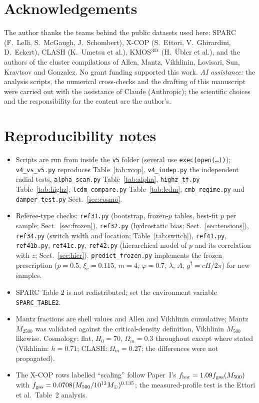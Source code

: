 \documentclass[11pt,a4paper]{article}
\newcommand{\gdag}{g^{\dagger}}
\newcommand{\Msun}{M_\odot}
\newcommand{\fgas}{f_{\rm gas}}
\begin{document}
\section*{Acknowledgements}
The author thanks the teams behind the public datasets used here: SPARC (F.~Lelli, S.~McGaugh, J.~Schombert), X-COP (S.~Ettori, V.~Ghirardini, D.~Eckert), CLASH (K.~Umetsu et al.), KMOS$^{\rm 3D}$ (H.~\"Ubler et al.), and the authors of the cluster compilations of Allen, Mantz, Vikhlinin, Lovisari, Sun, Kravtsov and Gonzalez. No grant funding supported this work. \emph{AI assistance:} the analysis scripts, the numerical cross-checks and the drafting of this manuscript were carried out with the assistance of Claude (Anthropic); the scientific choices and the responsibility for the content are the author's.

\appendix
\section{Reproducibility notes}
\label{app:repro}
\begin{itemize}[leftmargin=2em,itemsep=0.1em]
\item Scripts are run from inside the \texttt{v5} folder (several use \texttt{exec(open(\dots))}); \texttt{v4\_vs\_v5.py} reproduces Table~\ref{tab:xcop}, \texttt{v4\_indep.py} the independent radial tests, \texttt{alpha\_scan.py} Table~\ref{tab:alpha}, \texttt{highz\_tf.py} Table~\ref{tab:highz}, \texttt{lcdm\_compare.py} Table~\ref{tab:lcdm}, \texttt{cmb\_regime.py} and \texttt{damper\_test.py} Sect.~\ref{sec:cosmo}.
\item Referee-type checks: \texttt{ref31.py} (bootstrap, frozen-$p$ tables, best-fit $p$ per sample; Sect.~\ref{sec:frozen}), \texttt{ref32.py} (hydrostatic bias; Sect.~\ref{sec:tensions}), \texttt{ref34.py} (switch width and location; Table~\ref{tab:switch}), \texttt{ref41.py}, \texttt{ref41b.py}, \texttt{ref41c.py}, \texttt{ref42.py} (hierarchical model of $p$ and its correlation with $z$; Sect.~\ref{sec:hier}). \texttt{predict\_frozen.py} implements the frozen prescription ($p=0.5$, $\xi_c=0.115$, $m=4$, $\varphi=0.7$, $\lambda$, $A$, $\gdag=cH/2\pi$) for new samples.
\item SPARC Table 2 is not redistributed; set the environment variable \texttt{SPARC\_TABLE2}.
\item Mantz fractions are shell values and Allen and Vikhlinin cumulative; Mantz $M_{2500}$ was validated against the critical-density definition, Vikhlinin $M_{500}$ likewise. Cosmology: flat, $H_0=70$, $\Omega_m=0.3$ throughout except where stated (Vikhlinin: $h=0.71$; CLASH: $\Omega_m=0.27$; the differences were not propagated).
\item The X-COP rows labelled ``scaling'' follow Paper~I's $f_{\rm bar}=1.09\fgas(M_{500})$ with $\fgas=0.0708(M_{500}/10^{13}\Msun)^{0.135}$; the measured-profile test is the Ettori et al.\ Table~2 analysis.
\end{itemize}
\end{document}
